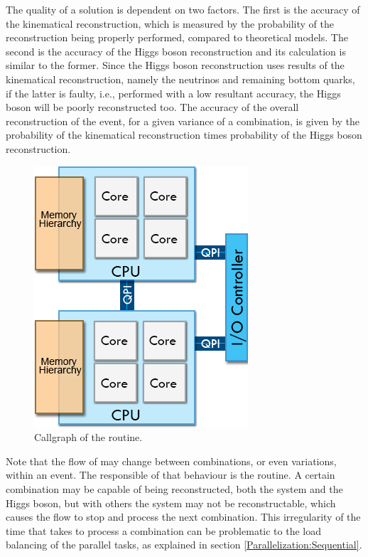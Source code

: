 The quality of a solution is dependent on two factors. The first is the accuracy of the kinematical reconstruction, which is measured by the probability of the reconstruction being properly performed, compared to theoretical models. The second is the accuracy of the Higgs boson reconstruction and its calculation is similar to the former. Since the Higgs boson reconstruction uses results of the kinematical reconstruction, namely the neutrinos and remaining bottom quarks, if the latter is faulty, i.e., performed with a low resultant accuracy, the Higgs boson will be poorly reconstructed too. The accuracy of the overall reconstruction of the event, for a given variance of a combination, is given by the probability of the kinematical reconstruction times probability of the Higgs boson reconstruction.

\begin{figure}[!htp]
	\begin{center}
		\includegraphics[scale=0.5]{../../common/img/numa_qpi.png}
		\caption{Callgraph of the \ttDilepKinFit routine.}
		\label{fig:CallgraphKinFit}
	\end{center}
\end{figure}

Note that the flow of \ttDilepKinFit may change between combinations, or even variations, within an event. The responsible of that behaviour is the \dilep routine. A certain combination may be capable of being reconstructed, both the \ttbar system and the Higgs boson, but with others the \ttbar system may not be reconstructable, which causes the \ttDilepKinFit flow to stop and process the next combination. This irregularity of the time that takes to process a combination can be problematic to the load balancing of the parallel tasks, as explained in section \ref{Parallelization:Sequential}.


